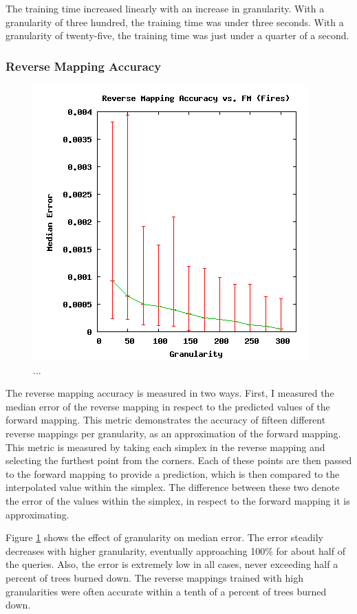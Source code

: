 The training time increased linearly with an increase in granularity.
With a granularity of three hundred, the training time was under three seconds.
With a granularity of twenty-five, the training time was just under a quarter of a second.


\subsubsection{Reverse Mapping Accuracy}

\begin{figure}[ht]
\centering
\includegraphics[scale=.5]{images/results_fires/rmaccfm.png}
\caption{...}
\label{fig:rmaccfm}
\end{figure}

The reverse mapping accuracy is measured in two ways.
First, I measured the median error of the reverse mapping in respect to the predicted values of the forward mapping.
This metric demonstrates the accuracy of fifteen different reverse mappings per granularity, as an approximation of the forward mapping.
This metric is measured by taking each simplex in the reverse mapping and selecting the furthest point from the corners.
Each of these points are then passed to the forward mapping to provide a prediction, which is then compared to the interpolated value within the simplex.
The difference between these two denote the error of the values within the simplex, in respect to the forward mapping it is approximating. 

Figure \ref{fig:rmaccfm} shows the effect of granularity on median error.
The error steadily decreases with higher granularity, eventually approaching 100\% for about half of the queries.
Also, the error is extremely low in all cases, never exceeding half a percent of trees burned down.
The reverse mappings trained with high granularities were often accurate within a tenth of a percent of trees burned down.

